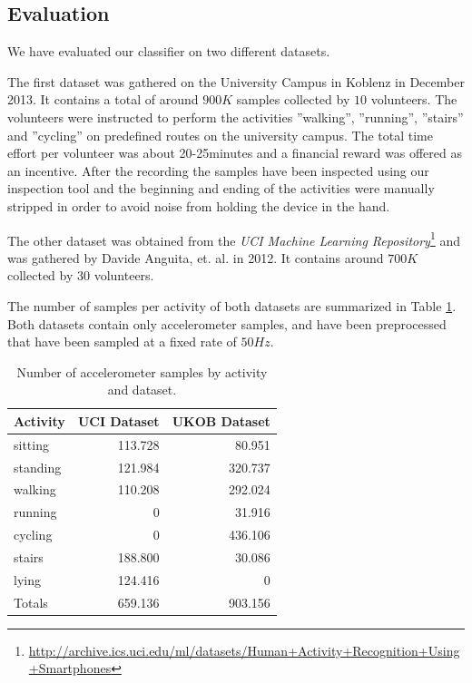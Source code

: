 \subsection{Evaluation}\label{sec:har_eval}

We have evaluated our classifier on two different datasets.

The first dataset was gathered on the University Campus in Koblenz in
December 2013.  It contains a total of around $900K$ samples collected
by $10$ volunteers.  The volunteers were instructed to perform the
activities ''walking'', ''running'', ''stairs'' and ''cycling'' on
predefined routes on the university campus. 
The total time effort per volunteer was about 20-25minutes and a financial reward was offered as
an incentive. After the recording the samples have been inspected
using our inspection tool and the beginning and ending of the
activities were manually stripped in order to avoid noise from holding
the device in the hand.


The other dataset was obtained from the {\it UCI Machine Learning
  Repository}\footnote{\url{http://archive.ics.uci.edu/ml/datasets/Human+Activity+Recognition+Using+Smartphones}}
and was gathered by Davide Anguita, et. al. \cite{Anguita} in 2012.
It contains around $700K$ collected by 30 volunteers.

The number of samples per activity of both datasets are summarized in
Table \ref{fig:har_datasets}. Both datasets contain only
accelerometer samples, and have been preprocessed that have been
sampled at a fixed rate of $50Hz$.

\begin{table}[h]
\centering
\begin{tabular}{|l|r|r|} \hline
Activity  & UCI Dataset & UKOB Dataset \\ \hline
sitting   & 113.728     & 80.951        \\
standing  & 121.984     & 320.737       \\
walking   & 110.208     & 292.024       \\
running   & 0           & 31.916        \\
cycling   & 0           & 436.106       \\
stairs    & 188.800     & 30.086        \\
lying     & 124.416     & 0            \\ \hline \hline
Totals    & 659.136     & 903.156       \\ \hline
\end{tabular}
\caption{Number of accelerometer samples by activity and dataset.}
\label{fig:har_datasets}
\end{table}

